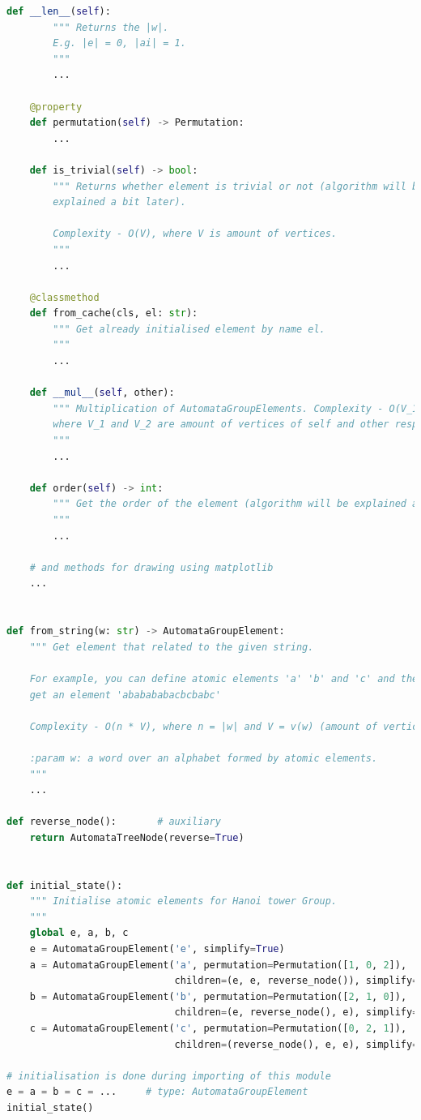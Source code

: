 \documentclass[a4paper,12pt]{amsart}
\begin{document}
\begin{appendices}
\begin{lstlisting}[language=python, basicstyle=\tiny]
    def __len__(self):
        """ Returns the |w|.
        E.g. |e| = 0, |ai| = 1.
        """
        ...

    @property
    def permutation(self) -> Permutation:
        ...

    def is_trivial(self) -> bool:
        """ Returns whether element is trivial or not (algorithm will be
        explained a bit later).

        Complexity - O(V), where V is amount of vertices.
        """
        ...

    @classmethod
    def from_cache(cls, el: str):
        """ Get already initialised element by name el.
        """
        ...

    def __mul__(self, other):
        """ Multiplication of AutomataGroupElements. Complexity - O(V_1 + V_2),
        where V_1 and V_2 are amount of vertices of self and other respectively.
        """
        ...

    def order(self) -> int:
        """ Get the order of the element (algorithm will be explained a bit later).
        """
        ...

    # and methods for drawing using matplotlib
    ...


def from_string(w: str) -> AutomataGroupElement:
    """ Get element that related to the given string.

    For example, you can define atomic elements 'a' 'b' and 'c' and then
    get an element 'ababababacbcbabc'

    Complexity - O(n * V), where n = |w| and V = v(w) (amount of vertices)

    :param w: a word over an alphabet formed by atomic elements.
    """
    ...

def reverse_node():       # auxiliary
    return AutomataTreeNode(reverse=True)


def initial_state():
    """ Initialise atomic elements for Hanoi tower Group.
    """
    global e, a, b, c
    e = AutomataGroupElement('e', simplify=True)
    a = AutomataGroupElement('a', permutation=Permutation([1, 0, 2]),
                             children=(e, e, reverse_node()), simplify=True)
    b = AutomataGroupElement('b', permutation=Permutation([2, 1, 0]),
                             children=(e, reverse_node(), e), simplify=True)
    c = AutomataGroupElement('c', permutation=Permutation([0, 2, 1]),
                             children=(reverse_node(), e, e), simplify=True)

# initialisation is done during importing of this module
e = a = b = c = ...     # type: AutomataGroupElement
initial_state()

\end{lstlisting}

\end{appendices}
\end{document}
